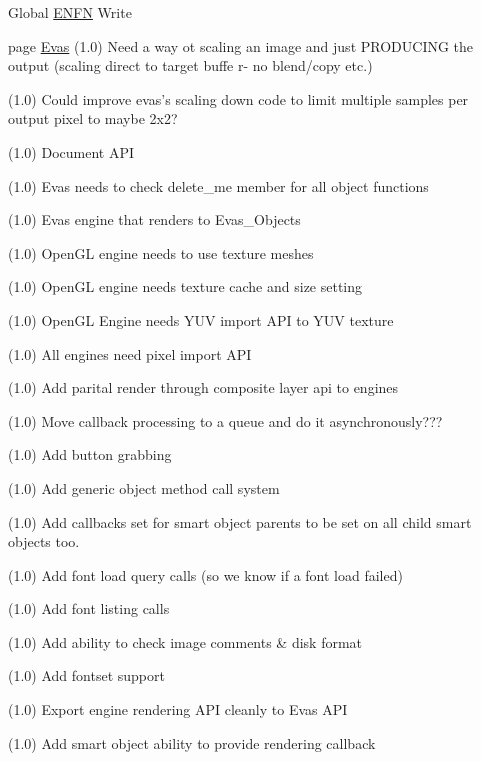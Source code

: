 \label{todo__todo000004}
\hypertarget{todo__todo000004}{}
 
\begin{DoxyDescription}
\item[Global \hyperlink{group__Evas__Object__Textblock_gac8ab2a94f6b027a2b24fffdd23b113fb}{ENFN} ]Write  
\end{DoxyDescription}

\label{todo__todo000001}
\hypertarget{todo__todo000001}{}
 
\begin{DoxyDescription}
\item[page \hyperlink{index}{Evas} ](1.0) Need a way ot scaling an image and just PRODUCING the output (scaling direct to target buffe r-\/ no blend/copy etc.) 

(1.0) Could improve evas's scaling down code to limit multiple samples per output pixel to maybe 2x2? 

(1.0) Document API 

(1.0) Evas needs to check delete\_\-me member for all object functions 

(1.0) Evas engine that renders to Evas\_\-Objects 

(1.0) OpenGL engine needs to use texture meshes 

(1.0) OpenGL engine needs texture cache and size setting 

(1.0) OpenGL Engine needs YUV import API to YUV texture 

(1.0) All engines need pixel import API 

(1.0) Add parital render through composite layer api to engines 

(1.0) Move callback processing to a queue and do it asynchronously??? 

(1.0) Add button grabbing 

(1.0) Add generic object method call system 

(1.0) Add callbacks set for smart object parents to be set on all child smart objects too. 

(1.0) Add font load query calls (so we know if a font load failed) 

(1.0) Add font listing calls 

(1.0) Add ability to check image comments \& disk format 

(1.0) Add fontset support 

(1.0) Export engine rendering API cleanly to Evas API 

(1.0) Add smart object ability to provide rendering callback 


\end{DoxyDescription}
